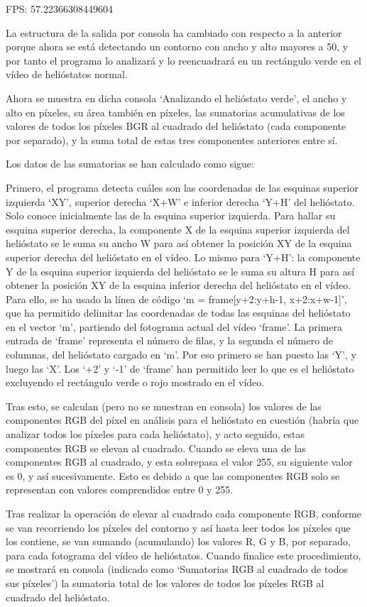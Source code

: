 \documentclass[12pt]{article}
\begin{document}
FPS: 57.22366308449604
 
La estructura de la salida por consola ha cambiado con respecto a la anterior porque ahora se está detectando un contorno con ancho y alto mayores a 50, y por tanto el programa lo analizará y lo reencuadrará en un rectángulo verde en el vídeo de helióstatos normal.

Ahora se muestra en dicha consola ‘Analizando el helióstato verde’, el ancho y alto en píxeles, su área también en píxeles, las sumatorias acumulativas de los valores de todos los píxeles BGR al cuadrado del helióstato (cada componente por separado), y la suma total de estas tres componentes anteriores entre sí.

Los datos de las sumatorias se han calculado como sigue:

Primero, el programa detecta cuáles son las coordenadas de las esquinas superior izquierda ‘XY’, superior derecha ‘X+W’ e inferior derecha ‘Y+H’ del helióstato. Solo conoce inicialmente las de la esquina superior izquierda. Para hallar su esquina superior derecha, la componente X de la esquina superior izquierda del helióstato se le suma su ancho W para así obtener la posición XY de la esquina superior derecha del helióstato en el vídeo. Lo mismo para ‘Y+H’: la componente Y de la esquina superior izquierda del helióstato se le suma su altura H para así obtener la posición XY de la esquina inferior derecha del helióstato en el vídeo. Para ello, se ha usado la línea de código ‘m = frame[y+2:y+h-1, x+2:x+w-1]’, que ha permitido delimitar las coordenadas de todas las esquinas del helióstato en el vector ‘m’, partiendo del fotograma actual del vídeo ‘frame’. La primera entrada de ‘frame’ representa el número de filas, y la segunda el número de columnas, del helióstato cargado en ‘m’. Por eso primero se han puesto las ‘Y’, y luego las ‘X’. Los ‘+2’ y ‘-1’ de ‘frame’ han permitido leer lo que es el helióstato excluyendo el rectángulo verde o rojo mostrado en el vídeo.

Tras esto, se calculan (pero no se muestran en consola) los valores de las componentes RGB del píxel en análisis para el helióstato en cuestión (habría que analizar todos los píxeles para cada helióstato), y acto seguido, estas componentes RGB se elevan al cuadrado. Cuando se eleva una de las componentes RGB al cuadrado, y esta sobrepasa el valor 255, su siguiente valor es 0, y así sucesivamente. Esto es debido a que las componentes RGB solo se representan con valores comprendidos entre 0 y 255.

Tras realizar la operación de elevar al cuadrado cada componente RGB, conforme se van recorriendo los píxeles del contorno y así hasta leer todos los píxeles que los contiene, se van sumando (acumulando) los valores R, G y B, por separado, para cada fotograma del vídeo de helióstatos. Cuando finalice este procedimiento, se mostrará en consola (indicado como ‘Sumatorias RGB al cuadrado de todos sus píxeles’) la sumatoria total de los valores de todos los píxeles RGB al cuadrado del helióstato.
\end{document}
